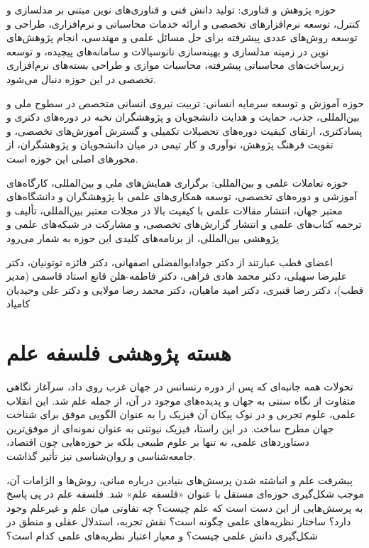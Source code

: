 \documentclass[
  letterpaper,
  DIV=11,
  numbers=noendperiod]{scrreprt}
\begin{document}
حوزه پژوهش و فناوری: تولید دانش فنی و فناوری‌های نوین مبتنی بر مدلسازی و
کنترل، توسعه نرم‌افزارهای تخصصی و ارائه خدمات محاسباتی و نرم‌افزاری، طراحی
و توسعه روش‌های عددی پیشرفته برای حل مسائل علمی و مهندسی، انجام پژوهش‌های
نوین در زمینه مدلسازی و بهینه‌سازی نانوسیالات و سامانه‌های پیچیده، و توسعه
زیرساخت‌های محاسباتی پیشرفته، محاسبات موازی و طراحی بسته‌های نرم‌افزاری
تخصصی در این حوزه دنبال می‌شود.

حوزه آموزش و توسعه سرمایه انسانی: تربیت نیروی انسانی متخصص در سطوح ملی و
بین‌المللی، جذب، حمایت و هدایت دانشجویان و پژوهشگران نخبه در دوره‌های
دکتری و پسادکتری، ارتقای کیفیت دوره‌های تحصیلات تکمیلی و گسترش آموزش‌های
تخصصی، و تقویت فرهنگ پژوهش، نوآوری و کار تیمی در میان دانشجویان و
پژوهشگران، از محورهای اصلی این حوزه است.

حوزه تعاملات علمی و بین‌المللی: برگزاری همایش‌های ملی و بین‌المللی،
کارگاه‌های آموزشی و دوره‌های تخصصی، توسعه همکاری‌های علمی با پژوهشگران و
دانشگاه‌های معتبر جهان، انتشار مقالات علمی با کیفیت بالا در مجلات معتبر
بین‌المللی، تألیف و ترجمه کتاب‌های علمی و انتشار گزارش‌های تخصصی، و مشارکت
در شبکه‌های علمی و پژوهشی بین‌المللی، از برنامه‌های کلیدی این حوزه به شمار
می‌رود

اعضای قطب عبارتند از دکتر جوادابوالفضلی اصفهانی، دکتر فائزه توتونیان،
دکتر علیرضا سهیلی، دکتر محمد هادی فراهی، دکتر فاطمه-هلن قانع استاد قاسمی
(مدیر قطب)، دکتر رضا قنبری، دکتر امید ماهیان، دکتر محمد رضا مولایی و
دکتر علی وحیدیان کامیاد

\section{هسته پژوهشی فلسفه
علم}\label{ux647ux633ux62aux647-ux67eux698ux648ux647ux634ux6cc-ux641ux644ux633ux641ux647-ux639ux644ux645}

تحولات همه‌ جانبه‌ای که پس از دوره رنسانس در جهان غرب روی داد، سرآغاز
نگاهی متفاوت از نگاه سنتی به جهان و پدیده‌های موجود در آن، از جمله علم
شد. این انقلاب علمی، علوم تجربی و در نوک پیکان آن فیزیک را به عنوان
الگویی موفق برای شناخت جهان مطرح ساخت. در این راستا، فیزیک نیوتنی به
عنوان نمونه‌ای از موفق‌ترین دستاوردهای علمی، نه تنها بر علوم طبیعی بلکه بر
حوزه‌هایی چون اقتصاد، جامعه‌شناسی و روان‌شناسی نیز تأثیر گذاشت.

پیشرفت علم و انباشته شدن پرسش‌های بنیادین درباره مبانی، روش‌ها و الزامات
آن، موجب شکل‌گیری حوزه‌ای مستقل با عنوان «فلسفه علم» شد. فلسفه علم در پی
پاسخ به پرسش‌هایی از این دست است که علم چیست؟ چه تفاوتی میان علم و غیرعلم
وجود دارد؟ ساختار نظریه‌های علمی چگونه است؟ نقش تجربه، استدلال عقلی و
منطق در شکل‌گیری دانش علمی چیست؟ و معیار اعتبار نظریه‌های علمی کدام است؟
\end{document}
